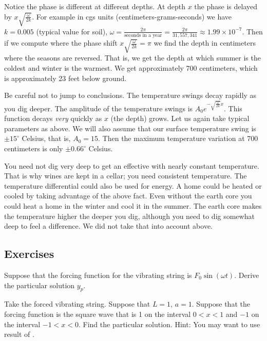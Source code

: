 Notice the phase is different at different depths.  At depth $x$ the
phase is delayed by $x \sqrt{\frac{\omega}{2k}}$.
For example in cgs units (centimeters-grams-seconds)
we have $k=0.005$ (typical value for soil),
$\omega = \frac{2\pi}{\text{seconds in a year}}
= \frac{2\pi}{31,557,341} \approx 1.99 \times {10}^{-7}$.   Then
if we compute where the phase shift $x \sqrt{\frac{\omega}{2k}} = \pi$
we find the depth in centimeters where the seasons are reversed.  That is,
we get the depth at which summer is the coldest and winter is the warmest.
We get
approximately 700 centimeters, which is approximately 23 feet below ground.

Be careful not to jump to conclusions.  The temperature swings decay rapidly as you dig deeper.  The
amplitude of the temperature swings is
$A_0 e^{-\sqrt{\frac{\omega}{2k}} x}$.  This function decays \emph{very}
quickly as $x$ (the depth) grows.
Let us again take
typical parameters as above.  We will also assume that
our surface temperature swing is $\pm {15}^\circ$ Celsius, that is,
$A_0 = 15$.  Then the maximum temperature variation at 700 centimeters
is only $\pm {0.66}^\circ$ Celsius.

You need not dig very deep to get an effective
 with nearly constant temperature.  That is why wines are kept in a cellar; you need consistent
temperature.
The temperature differential could also be used for energy.  A home could
be heated or cooled by taking advantage of the above fact.
Even without the earth core you could heat a home in the winter and cool it
in the summer.  The earth core makes the
temperature higher the deeper you dig, although you need to dig somewhat
deep to feel a difference.
We did not take that into account above.

\subsection{Exercises}

\begin{exercise} \label{sps:sinforceexr}
Suppose that the forcing function for the vibrating string
is $F_0 \sin (\omega t)$.  Derive the particular solution $y_p$.
\end{exercise}

\begin{exercise}
Take the forced vibrating string.
Suppose that $L=1$, $a=1$.  Suppose that the forcing function
is the square wave that is 1 on the interval $0 < x < 1$ and
$-1$ on the interval $-1 < x< 0$.
Find the particular solution.  Hint: You may want to use result
of .
\end{exercise}

